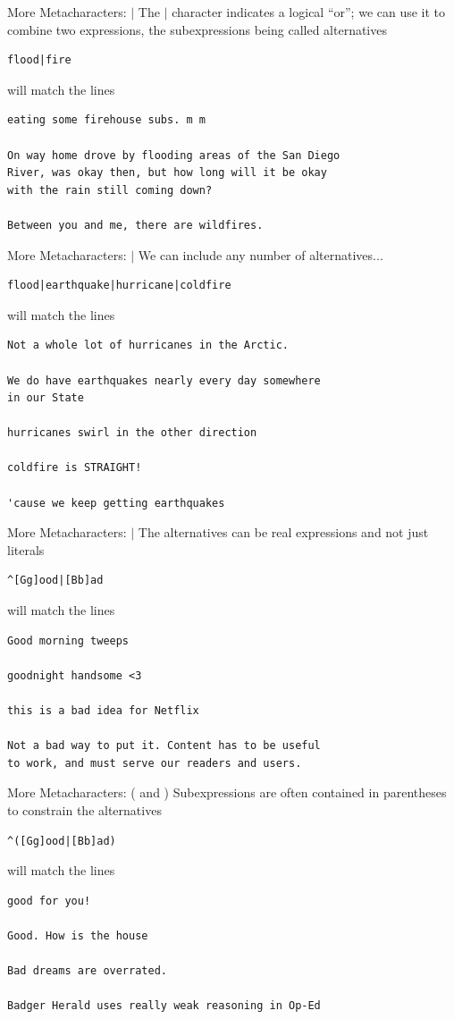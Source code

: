 \documentclass{beamer}
\begin{document}
\begin{frame}[fragile]{More Metacharacters: $|$}
The $|$ character indicates a logical ``or''; we can use it to combine two
expressions, the subexpressions being called alternatives
\begin{verbatim}
flood|fire
\end{verbatim}
will match the lines 
\begin{verbatim}
eating some firehouse subs. m m

On way home drove by flooding areas of the San Diego 
River, was okay then, but how long will it be okay 
with the rain still coming down?

Between you and me, there are wildfires.
\end{verbatim}
\end{frame}

\begin{frame}[fragile]{More Metacharacters: $|$}
We can include any number of alternatives...
\begin{verbatim}
flood|earthquake|hurricane|coldfire
\end{verbatim}
will match the lines 
\begin{verbatim}
Not a whole lot of hurricanes in the Arctic.

We do have earthquakes nearly every day somewhere 
in our State 

hurricanes swirl in the other direction 

coldfire is STRAIGHT! 

'cause we keep getting earthquakes
\end{verbatim}
\end{frame}

\begin{frame}[fragile]{More Metacharacters: $|$}
The alternatives can be real expressions and not just literals
\begin{verbatim}
^[Gg]ood|[Bb]ad
\end{verbatim}
will match the lines 
\begin{verbatim}
Good morning tweeps

goodnight handsome <3

this is a bad idea for Netflix

Not a bad way to put it. Content has to be useful 
to work, and must serve our readers and users.
\end{verbatim}
\end{frame}

\begin{frame}[fragile]{More Metacharacters: ( and )}
Subexpressions are often contained in parentheses to constrain the 
alternatives
\begin{verbatim}
^([Gg]ood|[Bb]ad)
\end{verbatim}
will match the lines 
\begin{verbatim}
good for you!

Good. How is the house

Bad dreams are overrated.

Badger Herald uses really weak reasoning in Op-Ed
\end{verbatim}
\end{frame}
\end{document}
